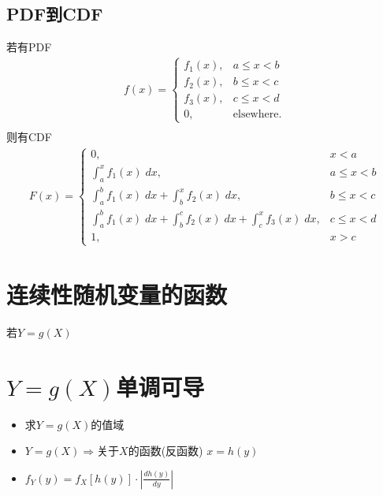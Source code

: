 \documentclass[a4paper]{report}
\begin{document}
\subsection{PDF到CDF}
若有PDF
\begin{align*}
  f(x)=\begin{cases}
    f_1(x),&a\leq x<b\\
    f_2(x),&b\leq x<c\\
    f_3(x),&c\leq x<d\\
    0,&\text{elsewhere.}
  \end{cases}\\
\end{align*}
则有CDF
\begin{align*}
  F(x)=\begin{cases}
    0,&x<a\\
    \int_a^x f_1(x)\;dx,&a\leq x<b\\
    \int_a^b f_1(x)\;dx+\int_b^x f_2(x)\;dx,&b\leq x<c\\
    \int_a^b f_1(x)\;dx+\int_b^c f_2(x)\;dx+\int_c^x f_3(x)\;dx,&c\leq x<d\\
    1,&x>c
  \end{cases}
\end{align*}
\section{连续性随机变量的函数}
若$Y=g(X)$
\section{$Y=g(X)$单调可导}
\begin{itemize}
  \item 求$Y=g(X)$的值域
  \item $Y=g(X)\Rightarrow$关于$X$的函数(反函数) $x=h(y)$
  \item $f_Y(y)=f_X[h(y)]\cdot |\frac{d h(y) }{d y}|$
\end{itemize}
\end{document}
